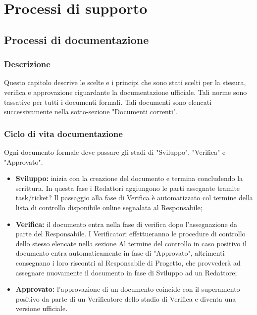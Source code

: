 \documentclass[NormeDiProgetto.tex]{subfiles}
\begin{document}
	
	\chapter{Processi di supporto}
	
	\section{Processi di documentazione}
	\subsection{Descrizione}
	Questo capitolo descrive le scelte e i principi che sono stati scelti per la
	stesura, verifica e approvazione riguardante la documentazione ufficiale.
	Tali norme sono tassative per tutti i documenti formali.
	Tali documenti sono elencati successivamente nella sotto-sezione "Documenti correnti". %
	
	\subsection{Ciclo di vita documentazione}
	Ogni documento formale deve passare gli stadi di "Sviluppo", "Verifica" e "Approvato".
	\begin{itemize}
		\item \textbf{Sviluppo:} inizia con la creazione del documento e termina concludendo la scrittura. In questa fase i Redattori aggiungono le parti assegnate tramite task/ticket? %
		Il passaggio alla fase di Verifica è automatizzato col termine della lista di controllo disponibile online segnalata al Responsabile;
		
		\item \textbf{Verifica:} il documento entra nella fase di verifica dopo l'assegnazione da parte del Responsabile.
		I Verificatori effettueranno le procedure di controllo dello stesso elencate nella sezione %
		Al termine del controllo in caso positivo il documento entra automaticamente in fase di "Approvato", altrimenti consegnano i loro riscontri al Responsabile di Progetto, che provvederà ad assegnare nuovamente il documento in fase di Sviluppo ad un Redattore;
		
		\item \textbf{Approvato:} l'approvazione di un documento coincide con il superamento positivo da parte di un Verificatore dello stadio di Verifica e diventa una versione ufficiale.
	\end{itemize}
	
\end{document}
